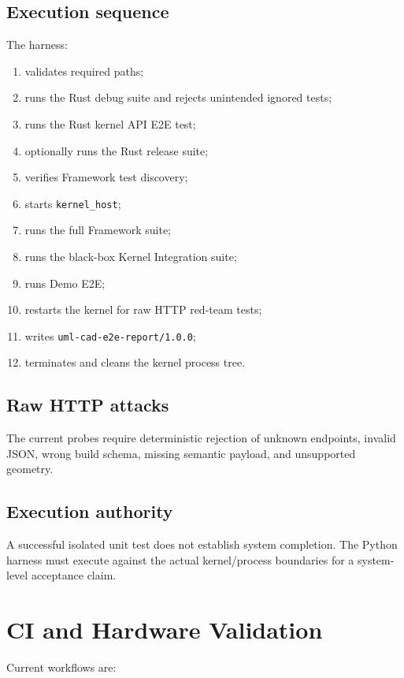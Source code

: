 \documentclass[11pt,a4paper]{report}
\begin{document}
\section{Execution sequence}
The harness:
\begin{enumerate}
\item validates required paths;
\item runs the Rust debug suite and rejects unintended ignored tests;
\item runs the Rust kernel API E2E test;
\item optionally runs the Rust release suite;
\item verifies Framework test discovery;
\item starts \texttt{kernel\_host};
\item runs the full Framework suite;
\item runs the black-box Kernel Integration suite;
\item runs Demo E2E;
\item restarts the kernel for raw HTTP red-team tests;
\item writes \texttt{uml-cad-e2e-report/1.0.0};
\item terminates and cleans the kernel process tree.
\end{enumerate}

\section{Raw HTTP attacks}
The current probes require deterministic rejection of unknown endpoints, invalid JSON, wrong build schema, missing semantic payload, and unsupported geometry.

\section{Execution authority}
A successful isolated unit test does not establish system completion. The Python harness must execute against the actual kernel/process boundaries for a system-level acceptance claim.

\chapter{CI and Hardware Validation}

Current workflows are:
\end{document}
